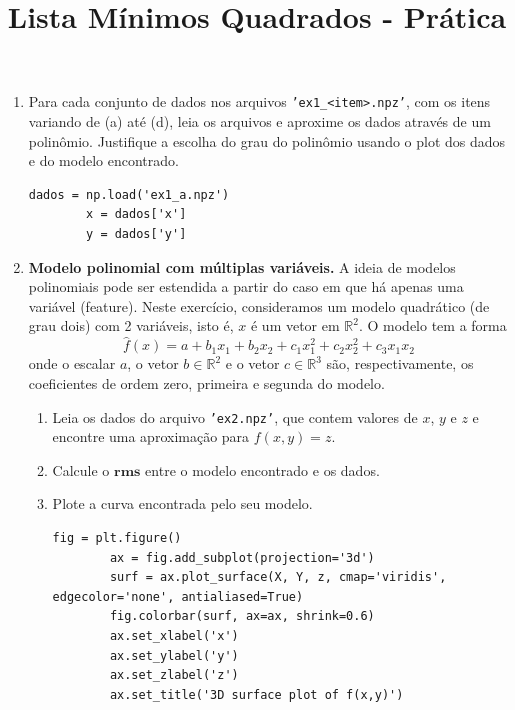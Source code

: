 \documentclass[a4paper,12pt]{article}
\title{Lista Mínimos Quadrados - Prática}
\author{}
\date{}
\begin{document}
\maketitle

\begin{enumerate}
    \item Para cada conjunto de dados nos arquivos \texttt{'ex1\_<item>.npz'}, com os itens variando de (a) até (d), leia os arquivos e aproxime os dados através de um polinômio. Justifique a escolha do grau do polinômio usando o plot dos dados e do modelo encontrado.
    
    \begin{lstlisting}[gobble=8,caption=Exemplo de leitura de arquivo:]
        dados = np.load('ex1_a.npz')
        x = dados['x']
        y = dados['y']
    \end{lstlisting}

    \item \textbf{Modelo polinomial com múltiplas variáveis.}  
    A ideia de modelos polinomiais pode ser estendida a partir do caso em que há apenas uma variável (feature).  
    Neste exercício, consideramos um modelo quadrático (de grau dois) com 2 variáveis, isto é, $x$ é um vetor em $\mathbb{R}^2$.  
    O modelo tem a forma
    \[
    \hat{f}(x) = a + b_1 x_1 + b_2 x_2 
    + c_1 x_1^2 + c_2 x_2^2
    + c_3 x_1 x_2
    \]
    onde o escalar $a$, o vetor $b \in \mathbb{R}^2$ e o vetor $c \in \mathbb{R}^3$ são, respectivamente, os coeficientes de ordem zero, primeira e segunda do modelo.

    \begin{enumerate}
        \item Leia os dados do arquivo  \texttt{'ex2.npz'}, que contem valores de $x$, $y$ e $z$ e encontre uma aproximação para $f(x,y)=z$.
        \item Calcule o $\mathbf{\text{rms}}$ entre o modelo encontrado e os dados.
        \item Plote a curva encontrada pelo seu modelo.
    \begin{lstlisting}[gobble=8,caption=Exemplo de plot de superficies]
        fig = plt.figure()
        ax = fig.add_subplot(projection='3d')
        surf = ax.plot_surface(X, Y, z, cmap='viridis', edgecolor='none', antialiased=True)
        fig.colorbar(surf, ax=ax, shrink=0.6)
        ax.set_xlabel('x')
        ax.set_ylabel('y')
        ax.set_zlabel('z')
        ax.set_title('3D surface plot of f(x,y)')
    \end{lstlisting}



\end{enumerate}
\end{enumerate}
\end{document}
